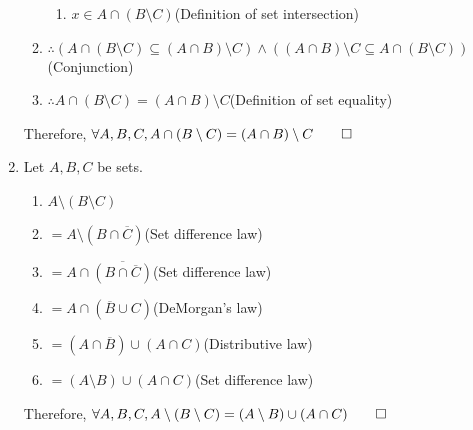 \documentclass[12pt, a4paper]{article}
\begin{document}
\begin{enumerate}[Q\arabic*.]
\begin{enumerate}[\arabic*.]
\begin{enumerate}[label=1.\arabic*]
          \item $x \in A \cap (B \setminus C)$\hfill(Definition of set intersection)
        \end{enumerate}
      \item $\therefore (A \cap (B \setminus C) \subseteq (A \cap B) \setminus C) \land ((A \cap B) \setminus C \subseteq A \cap (B \setminus C))$\hfill(Conjunction)
      \item $\therefore A \cap (B \setminus C) = (A \cap B) \setminus C$\hfill(Definition of set equality)
    \end{enumerate}
    Therefore, $\forall A, B, C, A \cap (B \setminus C) = (A \cap B) \setminus C \qed$

  \pagebreak
  \item Let $A, B, C$ be sets.
    \begin{enumerate}[\arabic*.]
      \item $A \setminus (B \setminus C)$
      \item $= A \setminus (B \cap \overline{C})$\hfill(Set difference law)
      \item $= A \cap \overline{(B \cap \overline{C})}$\hfill(Set difference law) 
      \item $= A \cap (\overline{B} \cup C)$\hfill(DeMorgan's law)
      \item $= (A \cap \overline{B}) \cup (A \cap C)$\hfill(Distributive law)
      \item $= (A \setminus B) \cup (A \cap C)$\hfill(Set difference law)
    \end{enumerate}
    Therefore, $\forall A, B, C, A \setminus (B \setminus C) = (A \setminus B) \cup (A \cap C) \qed$


\end{enumerate}
\end{document}

